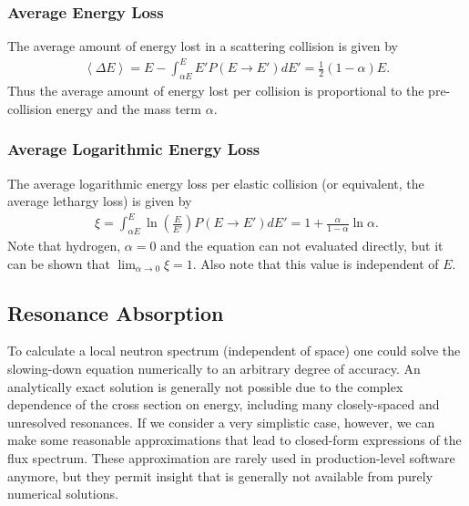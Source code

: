 \documentclass[11pt]{article}
\begin{document}
\subsubsection{Average Energy Loss}
\label{sec:orgheadline34}
The average amount of energy lost in a scattering collision is given by
\begin{align}
  \left< \Delta E \right> = E - \int_{\alpha E}^E E' P(E \rightarrow E') dE' = \frac{1}{2}(1-\alpha)E.
\end{align}
Thus the average amount of energy lost per collision is proportional to the pre-collision energy and the mass term \(\alpha\).

\subsubsection{Average Logarithmic Energy Loss}
\label{sec:orgheadline35}
The average logarithmic energy loss per elastic collision (or equivalent, the average lethargy loss) is given by
\begin{align}
  \xi = \int_{\alpha E}^E \ln\left(\frac{E}{E'}\right) P(E \rightarrow E') dE' = 1 + \frac{\alpha}{1-\alpha} \ln\alpha.
\end{align}
Note that hydrogen, \(\alpha = 0\) and the equation can not evaluated directly, but it can be shown that \(\lim_{\alpha \rightarrow 0} \xi = 1\).  Also note that this value is independent of \(E\).

\subsection{Resonance Absorption}
\label{sec:orgheadline40}
To calculate a local neutron spectrum (independent of space) one could solve the slowing-down equation numerically to an arbitrary degree of accuracy.  An analytically exact solution is generally not possible due to the complex dependence of the cross section on energy, including many closely-spaced and unresolved resonances.  If we consider a very simplistic case, however, we can make some reasonable approximations that lead to closed-form expressions of the flux spectrum.  These approximation are rarely used in production-level software anymore, but they permit insight that is generally not available from purely numerical solutions.  
\end{document}
